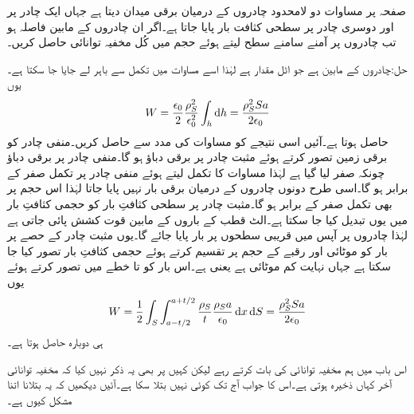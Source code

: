 صفحہ  پر مساوات  دو لامحدود چادروں کے درمیان برقی میدان دیتا ہے جہاں ایک چادر پر  اور دوسری چادر پر  سطحی کثافت بار پایا جاتا ہے۔اگر ان چادروں کے مابین فاصلہ  ہو تب چادروں پر آمنے سامنے  سطح لیتے ہوئے حجم    میں کُل مخفیہ توانائی حاصل کریں۔

حل:چادروں کے مابین  ہے جو اٹل مقدار ہے  لہٰذا اسے مساوات  میں تکمل سے باہر لے جایا جا سکتا ہے۔یوں
\begin{align}\label{مساوات_توانائی_مخفی_توانائی_ذخیرہ_الف}
W=\frac{\epsilon_0}{2}\frac{\rho_S^2}{\epsilon_0^2} \int_h \dif h =\frac{\rho_S^2 S a}{2 \epsilon_0}
\end{align}
حاصل ہوتا ہے۔آئیں اسی نتیجے کو مساوات  کی مدد سے حاصل کریں۔منفی چادر کو برقی زمین تصور کرتے ہوئے مثبت چادر پر  برقی دباؤ ہو گا۔منفی چادر پر برقی دباؤ چونکہ صفر لیا گیا ہے لہٰذا مساوات  کا تکمل لیتے ہوئے منفی چادر پر تکمل صفر کے برابر ہو گا۔اسی طرح دونوں چادروں کے درمیان برقی بار نہیں پایا جاتا لہٰذا اس حجم  پر بھی تکمل صفر کے برابر ہو گا۔مثبت چادر پر سطحی کثافتِ بار کو حجمی کثافتِ بار میں یوں تبدیل کیا جا سکتا ہے۔الٹ قطب کے باروں کے مابین قوت کشش پائی جاتی ہے لہٰذا چادروں پر آپس میں قریبی سطحوں پر بار پایا جائے گا۔یوں مثبت چادر  کے  حصے پر بار  کو  موٹائی اور  رقبے کے حجم  پر تقسیم کرتے ہوئے  حجمی کثافتِ بار تصور کیا جا سکتا ہے جہاں  نہایت کم موٹائی ہے یعنی  ہے۔اس بار کو  تا  خطے میں تصور کرتے ہوئے یوں
\begin{align}\label{مساوات_توانائی_مخفی_توانائی_ذخیرہ_ب}
W=\frac{1}{2}\int_S \int_{a-t/2}^{a+t/2} \frac{\rho_S}{t} \frac{\rho_S a}{\epsilon_0} \dif x \dif S=\frac{\rho_S^2 S a}{2 \epsilon_0}
\end{align}
ہی دوبارہ حاصل ہوتا ہے۔

اس باب میں ہم مخفیہ توانائی کی بات کرتے رہے لیکن کہیں پر بھی یہ ذکر نہیں کیا کہ مخفیہ توانائی آخر کہاں  ذخیرہ ہوتی ہے۔اس کا جواب آج تک کوئی نہیں بتلا سکا ہے۔آئیں دیکھیں کہ یہ بتلانا اتنا مشکل کیوں ہے۔

